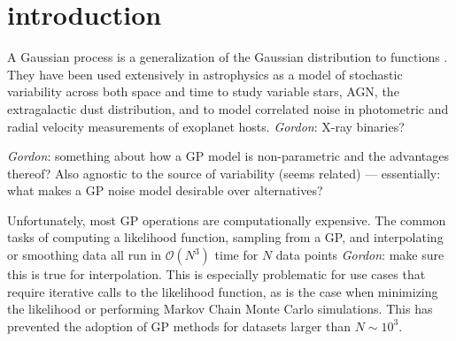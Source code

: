 \documentclass[modern]{aastex62}
\newcommand{\todo}[3]{{\color{#2}\emph{#1}: #3}}
\newcommand{\gordontodo}[1]{\todo{Gordon}{red}{#1}}
\begin{document}
\tableofcontents

\section{introduction}\label{sec:intro}
	A Gaussian process is a generalization of the Gaussian distribution to functions \citep{Rasmussen:2006}. They have been used 
	extensively in astrophysics as a model of stochastic variability across both space and time to study variable stars, AGN, the extragalactic 
	dust distribution, and to model correlated noise in photometric and radial velocity measurements of exoplanet hosts. \gordontodo{X-ray binaries?}
	
	\gordontodo{something about how a GP model is non-parametric and the advantages thereof? Also agnostic 
	to the source of variability (seems related) --- essentially: what makes a GP noise model desirable over alternatives?}
	
	Unfortunately, most GP operations are computationally expensive. The common tasks of computing a likelihood function, sampling from a GP, and 
	interpolating or smoothing data all run in $\mathcal{O}(N^3)$ time for $N$ data points \gordontodo{make sure this is true for interpolation}. This is 
	especially problematic for use cases that require iterative calls to the likelihood function, as is the case when minimizing the likelihood or performing 
	Markov Chain Monte Carlo simulations. This has prevented the adoption of GP methods for datasets larger than $N \sim 10^3$. 
	
\end{document}
